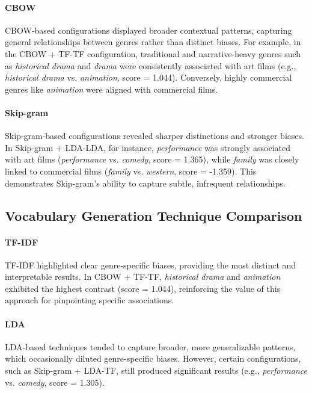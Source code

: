 \documentclass[conference]{IEEEtran}
\begin{document}
\paragraph{CBOW}
CBOW-based configurations displayed broader contextual patterns, capturing general relationships between genres rather than distinct biases. For example, in the CBOW + TF-TF configuration, traditional and narrative-heavy genres such as \textit{historical drama} and \textit{drama} were consistently associated with art films (e.g., \textit{historical drama} vs. \textit{animation}, score = 1.044). Conversely, highly commercial genres like \textit{animation} were aligned with commercial films.

\paragraph{Skip-gram}
Skip-gram-based configurations revealed sharper distinctions and stronger biases. In Skip-gram + LDA-LDA, for instance, \textit{performance} was strongly associated with art films (\textit{performance} vs. \textit{comedy}, score = 1.365), while \textit{family} was closely linked to commercial films (\textit{family} vs. \textit{western}, score = -1.359). This demonstrates Skip-gram's ability to capture subtle, infrequent relationships.

\subsection{Vocabulary Generation Technique Comparison}

\paragraph{TF-IDF}
TF-IDF highlighted clear genre-specific biases, providing the most distinct and interpretable results. In CBOW + TF-TF, \textit{historical drama} and \textit{animation} exhibited the highest contrast (score = 1.044), reinforcing the value of this approach for pinpointing specific associations.

\paragraph{LDA}
LDA-based techniques tended to capture broader, more generalizable patterns, which occasionally diluted genre-specific biases. However, certain configurations, such as Skip-gram + LDA-TF, still produced significant results (e.g., \textit{performance} vs. \textit{comedy}, score = 1.305).
\end{document}
